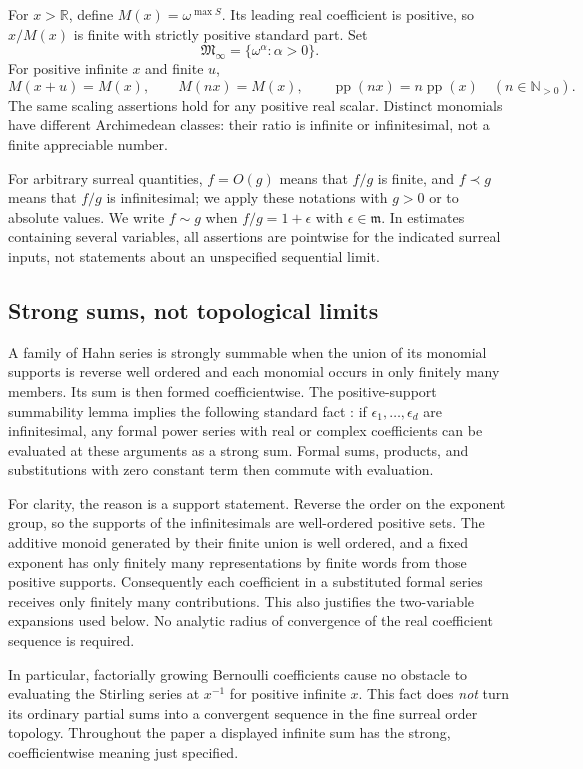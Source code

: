 \documentclass[11pt,letterpaper]{article}
\numberwithin{equation}{section}
\theoremstyle{plain}
\theoremstyle{definition}
\theoremstyle{remark}
\newcommand{\R}{\mathbb R}
\newcommand{\N}{\mathbb N}
\newcommand{\mi}{\mathfrak m}
\newcommand{\Minf}{\mathfrak M_{\infty}}
\newcommand{\pp}{\operatorname{pp}}
\begin{document}
For $x>\R$, define $M(x)=\omega^{\max S}$. Its leading real coefficient is
positive, so $x/M(x)$ is finite with strictly positive standard part. Set
\[
 \Minf=\{\omega^\alpha:\alpha>0\}.
\]
For positive infinite $x$ and finite $u$,
\begin{equation}\label{eq:monomial-rules}
 M(x+u)=M(x),\qquad M(nx)=M(x),\qquad \pp(nx)=n\pp(x)
 \quad(n\in\N_{>0}).
\end{equation}
The same scaling assertions hold for any positive real scalar. Distinct
monomials have different Archimedean classes: their ratio is infinite or
infinitesimal, not a finite appreciable number.

For arbitrary surreal quantities, $f=O(g)$ means that $f/g$ is finite, and
$f\prec g$ means that $f/g$ is infinitesimal; we apply these notations with
$g>0$ or to absolute values. We write $f\sim g$ when $f/g=1+\epsilon$ with
$\epsilon\in\mi$. In estimates containing several variables, all assertions
are pointwise for the indicated surreal inputs, not statements about an
unspecified sequential limit.

\subsection{Strong sums, not topological limits}
A family of Hahn series is strongly summable when the union of its monomial
supports is reverse well ordered and each monomial occurs in only finitely
many members. Its sum is then formed coefficientwise. The positive-support
summability lemma implies the following standard fact \cite{Neumann,vdDE}:
if $\epsilon_1,\ldots,\epsilon_d$ are infinitesimal, any formal power series
with real or complex coefficients can be evaluated at these arguments as a
strong sum. Formal sums, products, and substitutions with zero constant term
then commute with evaluation.

For clarity, the reason is a support statement. Reverse the order on the
exponent group, so the supports of the infinitesimals are well-ordered
positive sets. The additive monoid generated by their finite union is well
ordered, and a fixed exponent has only finitely many representations by
finite words from those positive supports. Consequently each coefficient
in a substituted formal series receives only finitely many contributions.
This also justifies the two-variable expansions used below. No analytic
radius of convergence of the real coefficient sequence is required.

In particular, factorially growing Bernoulli coefficients cause no obstacle
to evaluating the Stirling series at $x^{-1}$ for positive infinite $x$.
This fact does \emph{not} turn its ordinary partial sums into a convergent
sequence in the fine surreal order topology. Throughout the paper a displayed
infinite sum has the strong, coefficientwise meaning just specified.
\end{document}
